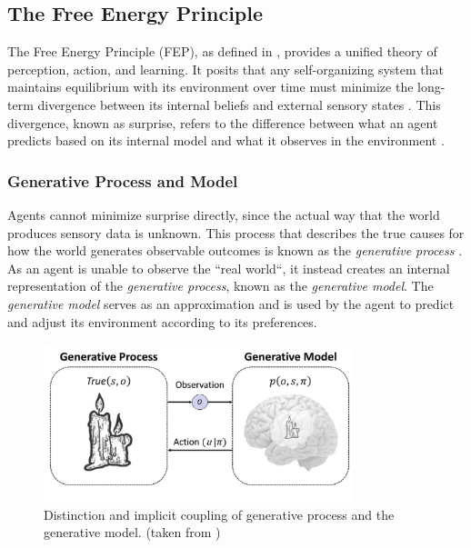 \subsection{The Free Energy Principle}
The Free Energy Principle (FEP), as defined in \cite{friston_free-energy_2010}, provides a unified
theory of perception, action, and learning. It posits that any self-organizing system that
maintains equilibrium with its environment over time must minimize the long-term divergence between its
internal beliefs and external sensory states \cite{friston_active_2017}. This divergence, known as
surprise, refers to the difference between what an agent predicts based on its internal model and what it observes in the environment \cite{sedlak_adaptive_2024}.


\subsubsection{Generative Process and Model}
Agents cannot minimize surprise directly, since the actual way that the world produces sensory data
is unknown. This process that describes the true causes for how the world generates observable
outcomes is known as the \textit{generative process} \cite{friston_free-energy_2010, smith_step-by-step_2022}. As an agent is unable to observe the ``real world``, it instead creates an internal representation of the \textit{generative process}, known as the \textit{generative model}. The \textit{generative model} serves as an approximation and is used by the agent to predict and adjust its environment according to its preferences.

\begin{figure}[htbp]
    \centering
    \includegraphics[width=0.8\textwidth]{img/generative-model-generative-process.png}
    \caption{Distinction and implicit coupling of generative process and the generative model. (taken from \cite{smith_step-by-step_2022})}
    \label{fig:generative-process-generative-model}
\end{figure}

